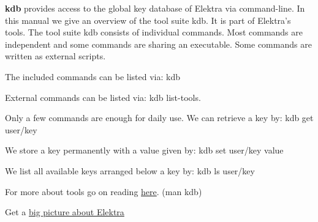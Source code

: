 {\bfseries kdb} provides access to the global key database of Elektra via command-\/line. In this manual we give an overview of the tool suite {\ttfamily kdb}. It is part of Elektra’s tools. The tool suite {\ttfamily kdb} consists of individual commands. Most commands are independent and some commands are sharing an executable. Some commands are written as external scripts.

The included commands can be listed via\+: {\ttfamily kdb}

External commands can be listed via\+: {\ttfamily kdb list-\/tools}.

Only a few commands are enough for daily use. We can retrieve a key by\+: {\ttfamily kdb get user/key}

We store a key permanently with a value given by\+: {\ttfamily kdb set user/key value}

We list all available keys arranged below a key by\+: {\ttfamily kdb ls user/key}


\begin{DoxyItemize}
\item For more about tools go on reading \hyperlink{md_doc_help_kdb_doc_help_kdb_md}{here}. ({\ttfamily man kdb})
\item Get a \hyperlink{doc_BIGPICTURE_md}{big picture about Elektra} 
\end{DoxyItemize}